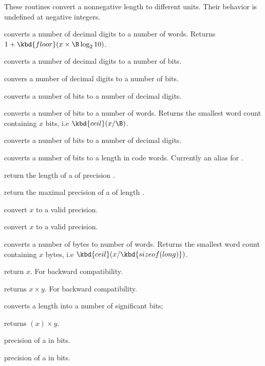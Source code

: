 
These routines convert a nonnegative length to different units. Their
behavior is undefined at negative integers.

 converts a number of decimal digits to a number
of words. Returns $ 1 + \kbd{floor}(x \times \B \log_2 10)$.

 converts a number of decimal digits to a number
of bits.

 convers a number of decimal digits to a
number of bits.

 converts a number of bits to a
number of decimal digits.

 converts a number of bits to a number of
words. Returns the smallest word count containing $x$ bits, i.e $
\kbd{ceil}(x / \B)$.

 converts a number of bits to a number of
decimal digits.

 converts a number of bits to a length
in code words. Currently  an alias for .

 return the length of a  of precision
.

 return the maximal precision of a 
of length .

 convert $x$ to a valid precision.

 convert $x$ to a valid precision.

 converts a number of bytes to number of
words. Returns the smallest word count containing $x$ bytes, i.e
$\kbd{ceil}(x / \kbd{sizeof(long)})$.

 return $x$. For backward compatibility.

 returns
$x\times y$. For backward compatibility.

 converts a length into a number
of significant bits;

 returns
$(x)\times y$.

 precision of a  in bits.

 precision of a  in bits.

